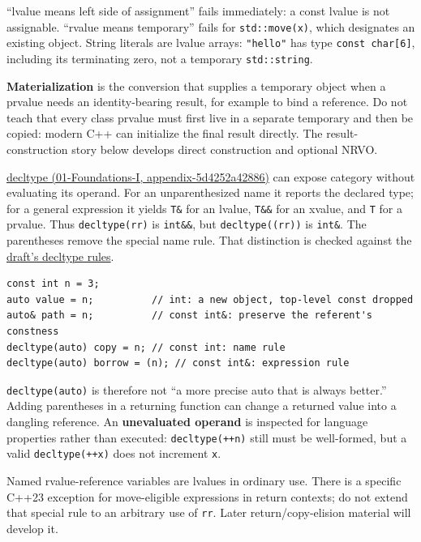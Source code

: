 ``lvalue means left side of assignment'' fails immediately: a const lvalue is not assignable. ``rvalue means temporary'' fails for \texttt{std::move(x)}, which designates an existing object. String literals are lvalue arrays: \texttt{"hello"} has type \texttt{const\ char{[}6{]}}, including its terminating zero, not a temporary \texttt{std::string}.

\textbf{Materialization} is the conversion that supplies a temporary object when a prvalue needs an identity-bearing result, for example to bind a reference. Do not teach that every class prvalue must first live in a separate temporary and then be copied: modern C++ can initialize the final result directly. The result-construction story below develops direct construction and optional NRVO.

\href{../01-Foundations-I/main.pdf\#nameddest=appendix-5d4252a42886}{decltype (01-Foundations-I, appendix-5d4252a42886)} can expose category without evaluating its operand. For an unparenthesized name it reports the declared type; for a general expression it yields \texttt{T\&} for an lvalue, \texttt{T\&\&} for an xvalue, and \texttt{T} for a prvalue. Thus \texttt{decltype(rr)} is \texttt{int\&\&}, but \texttt{decltype((rr))} is \texttt{int\&}. The parentheses remove the special name rule. That distinction is checked against the \href{https://eel.is/c++draft/dcl.type.decltype}{draft's decltype rules}.

\begin{verbatim}
const int n = 3;
auto value = n;          // int: a new object, top-level const dropped
auto& path = n;          // const int&: preserve the referent's constness
decltype(auto) copy = n; // const int: name rule
decltype(auto) borrow = (n); // const int&: expression rule
\end{verbatim}

\texttt{decltype(auto)} is therefore not ``a more precise auto that is always better.'' Adding parentheses in a returning function can change a returned value into a dangling reference. An \textbf{unevaluated operand} is inspected for language properties rather than executed: \texttt{decltype(++n)} still must be well-formed, but a valid \texttt{decltype(++x)} does not increment \texttt{x}.

Named rvalue-reference variables are lvalues in ordinary use. There is a specific C++23 exception for move-eligible expressions in return contexts; do not extend that special rule to an arbitrary use of \texttt{rr}. Later return/copy-elision material will develop it.

